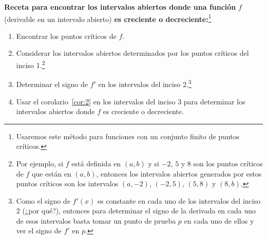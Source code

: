 \documentclass[12pt,a4paper]{book}
\newcommand{\receta}[1]{\par\addvspace{\medskipamount}#1\par\nobreak}
\begin{document}
    \receta{\textbf{Receta para encontrar los intervalos abiertos donde una función} \normalfont$f$ (derivable en un intervalo abierto) \textbf{es creciente o decreciente:}\footnote{Usaremos este método para funciones con un conjunto finito de puntos críticos.}}
    \begin{enumerate}[label=\arabic*.,nosep]
        \item Encontrar los puntos críticos de $f$.
        \item Considerar los intervalos abiertos determinados por los puntos críticos del
        inciso 1.\footnote{Por ejemplo, si $f$ está definida en $(a,b)$ y si $-2$, $5$ y $8$ son los puntos críticos de $f$ que
        están en $(a,b)$, entonces los intervalos abiertos generados por estos puntos críticos son los
        intervalos $(a,-2)$, $(-2,5)$, $(5,8)$ y $(8,b)$.}
        \item Determinar el signo de $f'$ en los intervalos del inciso 2.\footnote{Como el signo de $f'(x)$ es constante en cada uno de los intervalos del inciso 2 (¿por
        qué?), entonces para determinar el signo de la derivada en cada uno de esos intervalos
        basta tomar un punto de prueba $p$ en cada uno de ellos y ver el signo de $f'$ en $p$.}
        \item Usar el corolario~\ref{cor:2} en los intervalos del inciso 3 para determinar los intervalos
        abiertos donde $f$ es creciente o decreciente.
    \end{enumerate}
\end{document}
